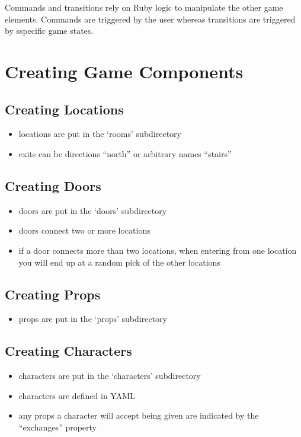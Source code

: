 \documentclass[letterpaper,10pt,english]{manual}
\begin{document}
Commands and transitions rely on Ruby logic to manipulate the other game elements. Commands are triggered by the user whereas transitions are triggered by sspecific game states.

\resetcurrentobjects
\hypertarget{--doc-components}{}

\chapter{Creating Game Components}


\section{Creating Locations}
\begin{itemize}
\item {} 
locations are put in the `rooms' subdirectory

\item {} 
exits can be directions ``north'' or arbitrary names ``stairs''

\end{itemize}


\section{Creating Doors}
\begin{itemize}
\item {} 
doors are put in the `doors' subdirectory

\item {} 
doors connect two or more locations

\item {} 
if a door connects more than two locations, when entering from one location you will end up at a random pick of the other locations

\end{itemize}


\section{Creating Props}
\begin{itemize}
\item {} 
props are put in the `props' subdirectory

\end{itemize}


\section{Creating Characters}
\begin{itemize}
\item {} 
characters are put in the `characters' subdirectory

\item {} 
characters are defined in YAML

\item {} 
any props a character will accept being given are indicated by the ``exchanges'' property

\end{itemize}
\end{document}
